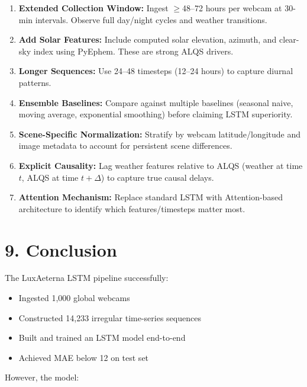\documentclass[11pt,a4paper]{article}
\begin{document}
\begin{enumerate}
    \item \textbf{Extended Collection Window:} Ingest $\geq$48--72 hours per webcam at 30-min intervals. Observe full day/night cycles and weather transitions.
    
    \item \textbf{Add Solar Features:} Include computed solar elevation, azimuth, and clear-sky index using PyEphem. These are strong ALQS drivers.
    
    \item \textbf{Longer Sequences:} Use 24--48 timesteps (12--24 hours) to capture diurnal patterns.
    
    \item \textbf{Ensemble Baselines:} Compare against multiple baselines (seasonal naive, moving average, exponential smoothing) before claiming LSTM superiority.
    
    \item \textbf{Scene-Specific Normalization:} Stratify by webcam latitude/longitude and image metadata to account for persistent scene differences.
    
    \item \textbf{Explicit Causality:} Lag weather features relative to ALQS (weather at time $t$, ALQS at time $t+\Delta$) to capture true causal delays.
    
    \item \textbf{Attention Mechanism:} Replace standard LSTM with Attention-based architecture to identify which features/timesteps matter most.
\end{enumerate}

\section{9. Conclusion}

The LuxAeterna LSTM pipeline successfully:

\begin{itemize}
    \item[\checkmark] Ingested 1,000 global webcams
    \item[\checkmark] Constructed 14,233 irregular time-series sequences
    \item[\checkmark] Built and trained an LSTM model end-to-end
    \item[\checkmark] Achieved MAE below 12 on test set
\end{itemize}

However, the model:
\end{document}
